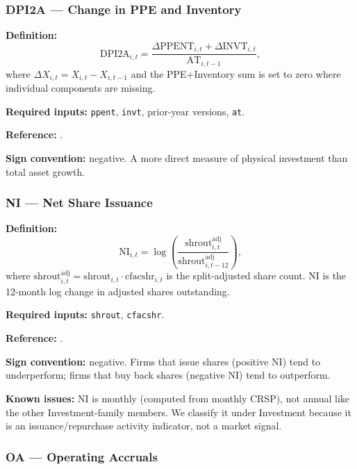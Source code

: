 \subsubsection{DPI2A --- Change in PPE and Inventory}

\textbf{Definition:}
\begin{equation}
\mathrm{DPI2A}_{i,t} = \frac{\Delta \mathrm{PPENT}_{i,t}
                              + \Delta \mathrm{INVT}_{i,t}}
                            {\mathrm{AT}_{i,t-1}},
\label{eq:dpi2a}
\end{equation}
where $\Delta X_{i,t} = X_{i,t} - X_{i,t-1}$ and the PPE+Inventory
sum is set to zero where individual components are missing.

\textbf{Required inputs:} \texttt{ppent}, \texttt{invt}, prior-year
versions, \texttt{at}.

\textbf{Reference:} \cite{LyandresSunZhang2008}.

\textbf{Sign convention:} negative. A more direct measure of physical
investment than total asset growth.

\subsubsection{NI --- Net Share Issuance}

\textbf{Definition:}
\begin{equation}
\mathrm{NI}_{i,t} = \log\left(
   \frac{\mathrm{shrout}^{\mathrm{adj}}_{i,t}}
        {\mathrm{shrout}^{\mathrm{adj}}_{i,t-12}}
\right),
\label{eq:ni}
\end{equation}
where $\mathrm{shrout}^{\mathrm{adj}}_{i,t} = \mathrm{shrout}_{i,t}
\cdot \mathrm{cfacshr}_{i,t}$ is the split-adjusted share count. NI is
the 12-month log change in adjusted shares outstanding.

\textbf{Required inputs:} \texttt{shrout}, \texttt{cfacshr}.

\textbf{Reference:} \cite{PontiffWoodgate2008,DanielTitman2006}.

\textbf{Sign convention:} negative. Firms that issue shares
(positive NI) tend to underperform; firms that buy back shares
(negative NI) tend to outperform.

\textbf{Known issues:} NI is monthly (computed from monthly CRSP),
not annual like the other Investment-family members. We classify it
under Investment because it is an issuance/repurchase activity
indicator, not a market signal.

\subsubsection{OA --- Operating Accruals}

